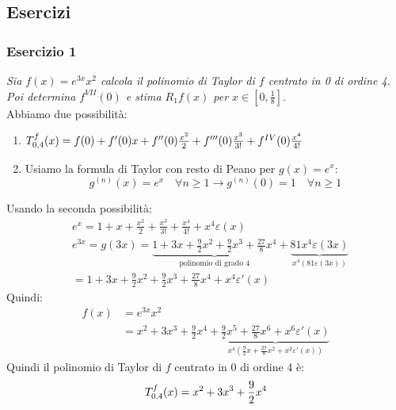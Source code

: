 \documentclass[12pt, a4paper]{report}
\begin{document}
        \subsection{Esercizi}
            \subsubsection{Esercizio 1}
                \textit{Sia $f(x)=e^{3x}x^{2}$ calcola il polinomio di Taylor  di $f$ centrato in 0 di ordine 4. Poi determina  $f^{VII}(0)$ e stima $R_{1}f(x)$ per $x\in\left[0,\frac{1}{8}\right]$}. \\
                Abbiamo due possibilità:
                \begin{enumerate}
                    \item $\taylor{f}{0}{4}(x)=f(0)+f'(0)x+f''(0)\frac{x^{2}}{2}+f'''(0)\frac{x^{3}}{3!}+f^{IV}(0)\frac{x^{4}}{4!}$
                    \item Usiamo la formula di Taylor con resto di Peano per $g(x)=e^{x}$: \begin{equation*}
                        g^{(n)}(x)=e^{x} \quad \forall n\geq 1 \rightarrow g^{(n)}(0)=1 \quad \forall n\geq 1
                    \end{equation*}
                \end{enumerate}
                Usando la seconda possibilità:
                \begin{equation*}
                    \begin{split}
                        &e^{x}=1+x+\frac{x^{2}}{2}+\frac{x^{3}}{3!}+\frac{x^{4}}{4!}+x^{4}\varepsilon(x) \\
                        &e^{3x} = g(3x) = \underbrace{1+3x+\frac{9}{2}x^{2}+\frac{9}{2}x^{3}+\frac{27}{8}x^{4}}_{\text{polinomio di grado 4}}+\underbrace{81x^{4}\varepsilon(3x)}_{x^{4}\left(81\varepsilon(3x)\right)} \\
                        &= 1+3x+\frac{9}{2}x^{2}+\frac{9}{2}x^{3}+\frac{27}{8}x^{4}+x^{4}\varepsilon'(x)
                    \end{split}
                \end{equation*}
                Quindi:
                \begin{equation*}
                    \begin{split}
                        f(x) &= e^{3x}x^{2} \\
                        &= x^{2}+3x^{3}+\frac{9}{2}x^{4}+\underbrace{\frac{9}{2}x^{5}+\frac{27}{8}x^{6}+x^{6}\varepsilon'(x)}_{x^{4}\left(\frac{9}{2}x+\frac{27}{8}x^{2}+x^{2}\varepsilon'(x)\right)}
                    \end{split}
                \end{equation*}
                Quindi il polinomio di Taylor di $f$ centrato in 0 di ordine 4 è:
                \begin{equation*}
                    \taylor{f}{0}{4}(x) = x^{2}+3x^{3}+\frac{9}{2}x^{4}
                \end{equation*}
\end{document}
